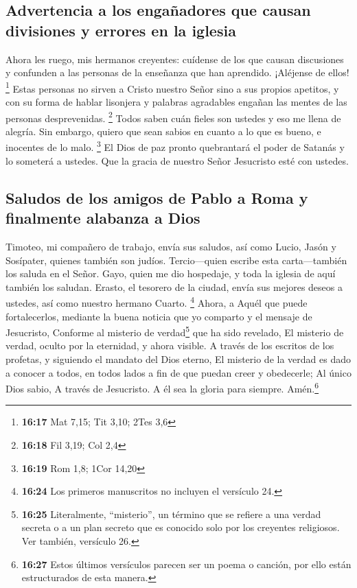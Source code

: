 \hypertarget{advertencia-a-los-engauxf1adores-que-causan-divisiones-y-errores-en-la-iglesia}{%
\subsection{Advertencia a los engañadores que causan divisiones y
errores en la
iglesia}\label{advertencia-a-los-engauxf1adores-que-causan-divisiones-y-errores-en-la-iglesia}}

 Ahora les ruego, mis hermanos creyentes: cuídense de los
que causan discusiones y confunden a las personas de la enseñanza que
han aprendido. ¡Aléjense de ellos! \footnote{\textbf{16:17} Mat 7,15;
  Tit 3,10; 2Tes 3,6}  Estas personas no sirven a Cristo
nuestro Señor sino a sus propios apetitos, y con su forma de hablar
lisonjera y palabras agradables engañan las mentes de las personas
desprevenidas. \footnote{\textbf{16:18} Fil 3,19; Col 2,4}
 Todos saben cuán fieles son ustedes y eso me llena de
alegría. Sin embargo, quiero que sean sabios en cuanto a lo que es
bueno, e inocentes de lo malo. \footnote{\textbf{16:19} Rom 1,8; 1Cor
  14,20}  El Dios de paz pronto quebrantará el poder de
Satanás y lo someterá a ustedes. Que la gracia de nuestro Señor
Jesucristo esté con ustedes.

\hypertarget{saludos-de-los-amigos-de-pablo-a-roma-y-finalmente-alabanza-a-dios}{%
\subsection{Saludos de los amigos de Pablo a Roma y finalmente alabanza
a
Dios}\label{saludos-de-los-amigos-de-pablo-a-roma-y-finalmente-alabanza-a-dios}}

 Timoteo, mi compañero de trabajo, envía sus saludos, así
como Lucio, Jasón y Sosípater, quienes también son judíos.
 Tercio---quien escribe esta carta---también los saluda
en el Señor.  Gayo, quien me dio hospedaje, y toda la
iglesia de aquí también los saludan. Erasto, el tesorero de la ciudad,
envía sus mejores deseos a ustedes, así como nuestro hermano Cuarto.
 \footnote{\textbf{16:24} Los primeros manuscritos no
  incluyen el versículo 24.}  Ahora, a Aquél que puede
fortalecerlos, mediante la buena noticia que yo comparto y el mensaje de
Jesucristo, Conforme al misterio de verdad\footnote{\textbf{16:25}
  Literalmente, ``misterio'', un término que se refiere a una verdad
  secreta o a un plan secreto que es conocido solo por los creyentes
  religiosos. Ver también, versículo 26.} que ha sido revelado, El
misterio de verdad, oculto por la eternidad,  y ahora
visible. A través de los escritos de los profetas, y siguiendo el
mandato del Dios eterno, El misterio de la verdad es dado a conocer a
todos, en todos lados a fin de que puedan creer y obedecerle;
 Al único Dios sabio, A través de Jesucristo. A él sea la
gloria para siempre. Amén.\footnote{\textbf{16:27} Estos últimos
  versículos parecen ser un poema o canción, por ello están
  estructurados de esta manera.}

